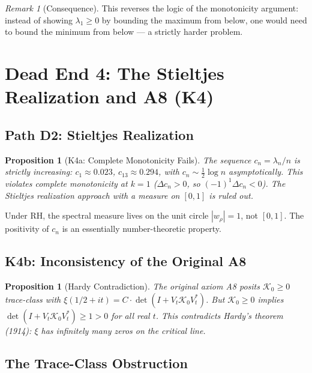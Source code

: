 \documentclass[12pt,a4paper]{article}
\newtheorem{proposition}[theorem]{Proposition}
\theoremstyle{definition}
\theoremstyle{remark}
\newtheorem{remark}[theorem]{Remark}
\begin{document}
\begin{remark}[Consequence]
This reverses the logic of the monotonicity argument: instead of showing $\lambda_1 \geq 0$ by bounding the maximum from below, one would need to bound the minimum from below --- a strictly harder problem.
\end{remark}


\section{Dead End 4: The Stieltjes Realization and A8 (K4)}
\label{sec:K4}

\subsection{Path D2: Stieltjes Realization}

\begin{proposition}[K4a: Complete Monotonicity Fails]
The sequence $c_n = \lambda_n/n$ is \emph{strictly increasing}: $c_1 \approx 0.023$, $c_{13} \approx 0.294$, with $c_n \sim \frac{1}{2}\log n$ asymptotically. This violates complete monotonicity at $k = 1$ ($\Delta c_n > 0$, so $(-1)^1\Delta c_n < 0$). The Stieltjes realization approach with a measure on $[0,1]$ is ruled out.
\end{proposition}

Under RH, the spectral measure lives on the unit circle $|w_\rho| = 1$, not $[0,1]$. The positivity of $c_n$ is an essentially number-theoretic property.

\subsection{K4b: Inconsistency of the Original A8}

\begin{proposition}[Hardy Contradiction]
The original axiom A8 posits $\mathcal{K}_0 \geq 0$ trace-class with $\xi(1/2+it) = C\cdot\det(I + V_t\mathcal{K}_0V_t^*)$. But $\mathcal{K}_0 \geq 0$ implies $\det(I + V_t\mathcal{K}_0V_t^*) \geq 1 > 0$ for all real $t$. This contradicts Hardy's theorem (1914): $\xi$ has infinitely many zeros on the critical line.
\end{proposition}

\subsection{The Trace-Class Obstruction}
\end{document}
